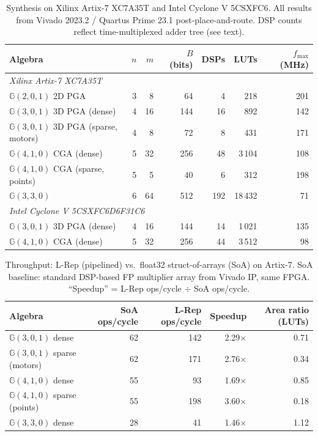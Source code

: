 \documentclass[11pt,a4paper]{article}
\theoremstyle{definition}
\theoremstyle{plain}
\theoremstyle{remark}
\newcommand{\GA}{\mathbb{G}}
\begin{document}
\begin{table}[h]
\centering
\caption{Synthesis on Xilinx Artix-7 XC7A35T and Intel Cyclone V 5CSXFC6.
All results from Vivado 2023.2 / Quartus Prime 23.1 post-place-and-route.
DSP counts reflect time-multiplexed adder tree (see text).}
\label{tab:synth}
\begin{tabular}{lrrrrrr}
\toprule
Algebra & $n$ & $m$ & $B$ (bits) & DSPs & LUTs & $f_{\max}$ (MHz) \\
\midrule
\multicolumn{7}{l}{\emph{Xilinx Artix-7 XC7A35T}} \\
$\GA(2,0,1)$ 2D PGA & 3 & 8 & 64 & 4 & 218 & 201 \\
$\GA(3,0,1)$ 3D PGA (dense) & 4 & 16 & 144 & 16 & 892 & 142 \\
$\GA(3,0,1)$ 3D PGA (sparse, motors) & 4 & 8 & 72 & 8 & 431 & 171 \\
$\GA(4,1,0)$ CGA (dense) & 5 & 32 & 256 & 48 & 3\,104 & 108 \\
$\GA(4,1,0)$ CGA (sparse, points) & 5 & 5 & 40 & 6 & 312 & 198 \\
$\GA(3,3,0)$ & 6 & 64 & 512 & 192 & 18\,432 & 71 \\
\midrule
\multicolumn{7}{l}{\emph{Intel Cyclone V 5CSXFC6D6F31C6}} \\
$\GA(3,0,1)$ 3D PGA (dense) & 4 & 16 & 144 & 14 & 1\,021 & 135 \\
$\GA(4,1,0)$ CGA (dense) & 5 & 32 & 256 & 44 & 3\,512 & 98 \\
\bottomrule
\end{tabular}
\end{table}

\begin{table}[h]
\centering
\caption{Throughput: L-Rep (pipelined) vs.\ float32 struct-of-arrays (SoA)
on Artix-7.
SoA baseline: standard DSP-based FP multiplier array from Vivado IP,
same FPGA.
``Speedup'' = L-Rep ops/cycle $\div$ SoA ops/cycle.}
\label{tab:throughput}
\begin{tabular}{lrrrr}
\toprule
Algebra & SoA ops/cycle & L-Rep ops/cycle & Speedup & Area ratio (LUTs) \\
\midrule
$\GA(3,0,1)$ dense & 62 & 142 & 2.29$\times$ & 0.71 \\
$\GA(3,0,1)$ sparse (motors) & 62 & 171 & 2.76$\times$ & 0.34 \\
$\GA(4,1,0)$ dense & 55 & 93 & 1.69$\times$ & 0.85 \\
$\GA(4,1,0)$ sparse (points) & 55 & 198 & 3.60$\times$ & 0.18 \\
$\GA(3,3,0)$ dense & 28 & 41 & 1.46$\times$ & 1.12 \\
\bottomrule
\end{tabular}
\end{table}
\end{document}
